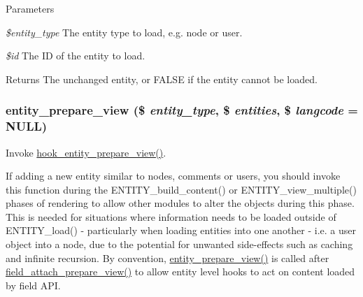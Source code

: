\begin{DoxyParams}{Parameters}
\item[{\em \$entity\_\-type}]The entity type to load, e.g. node or user. \item[{\em \$id}]The ID of the entity to load.\end{DoxyParams}
\begin{DoxyReturn}{Returns}
The unchanged entity, or FALSE if the entity cannot be loaded. 
\end{DoxyReturn}
\hypertarget{common_8inc_a180628d308e46de0a76e7cdc0e65ce4d}{
\subsubsection[{entity\_\-prepare\_\-view}]{\setlength{\rightskip}{0pt plus 5cm}entity\_\-prepare\_\-view (\$ {\em entity\_\-type}, \/  \$ {\em entities}, \/  \$ {\em langcode} = {\ttfamily NULL})}}
\label{common_8inc_a180628d308e46de0a76e7cdc0e65ce4d}
Invoke \hyperlink{group__hooks_ga7e60ef817e60b20497bda315d2f30163}{hook\_\-entity\_\-prepare\_\-view()}.

If adding a new entity similar to nodes, comments or users, you should invoke this function during the ENTITY\_\-build\_\-content() or ENTITY\_\-view\_\-multiple() phases of rendering to allow other modules to alter the objects during this phase. This is needed for situations where information needs to be loaded outside of ENTITY\_\-load() -\/ particularly when loading entities into one another -\/ i.e. a user object into a node, due to the potential for unwanted side-\/effects such as caching and infinite recursion. By convention, \hyperlink{common_8inc_a180628d308e46de0a76e7cdc0e65ce4d}{entity\_\-prepare\_\-view()} is called after \hyperlink{group__field__attach_ga12b5fce5e2b2adb487c485c63bfe0298}{field\_\-attach\_\-prepare\_\-view()} to allow entity level hooks to act on content loaded by field API.


